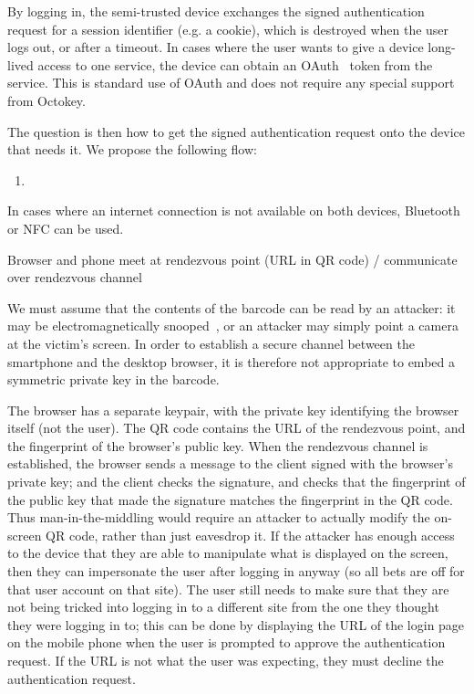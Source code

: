 By logging in, the semi-trusted device exchanges the signed authentication request for a session
identifier (e.g. a cookie), which is destroyed when the user logs out, or after a timeout. In cases
where the user wants to give a device long-lived access to one service, the device can obtain an
OAuth~\cite{OAuth} token from the service. This is standard use of OAuth and does not require any
special support from Octokey.

The question is then how to get the signed authentication request onto the device that needs it. We
propose the following flow:

\begin{enumerate}
\item 
\end{enumerate}

In cases where an internet connection is not available on both devices, Bluetooth or NFC can be
used.

Browser and phone meet at rendezvous point (URL in QR code) / communicate over rendezvous channel

We must assume that the contents of the barcode can be read by an attacker: it may be
electromagnetically snooped~\cite{Kuhn05}, or an attacker may simply point a camera at the victim's
screen. In order to establish a secure channel between the smartphone and the desktop browser, it is
therefore not appropriate to embed a symmetric private key in the barcode.

The browser has a separate keypair, with the private key identifying the browser itself (not the
user). The QR code contains the URL of the rendezvous point, and the fingerprint of the browser's
public key. When the rendezvous channel is established, the browser sends a message to the client
signed with the browser's private key; and the client checks the signature, and checks that the
fingerprint of the public key that made the signature matches the fingerprint in the QR code. Thus
man-in-the-middling would require an attacker to actually modify the on-screen QR code, rather than
just eavesdrop it. If the attacker has enough access to the device that they are able to manipulate
what is displayed on the screen, then they can impersonate the user after logging in anyway (so all
bets are off for that user account on that site). The user still needs to make sure that they are
not being tricked into logging in to a different site from the one they thought they were logging in
to; this can be done by displaying the URL of the login page on the mobile phone when the user is
prompted to approve the authentication request. If the URL is not what the user was expecting, they
must decline the authentication request.
